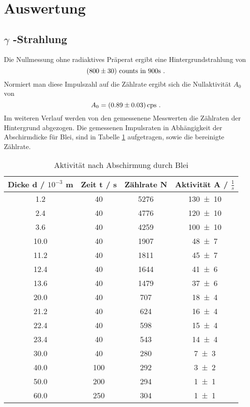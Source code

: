\section{Auswertung}
\label{sec:Auswertung}
\subsection{\texorpdfstring{$\gamma$ -Strahlung }%
                               {gamma -Strahlung}}
Die Nullmessung ohne radiaktives Präperat ergibt eine Hintergrundstrahlung von 
\begin{equation}
  (\num{800 +- 30}) \text{ counts in } 900 \text{s} \ .
  \label{eqn:gammacoun}
\end{equation}
Normiert man diese Impulszahl auf die Zählrate ergibt sich die Nullaktivität $A_0$ von
\begin{equation}
  A_0 = (\num{0.89 +- 0.03}) \, \text{cps} \ .
  \label{eqn:A0}
\end{equation}
Im weiteren Verlauf werden von den gemessenene Messwerten die Zählraten der Hintergrund abgezogen. Die gemessenen Impulsraten in Abhängigkeit der Abschirmdicke für Blei, sind in Tabelle \ref{tab:ABlei} aufgetragen, sowie die bereinigte Zählrate.
\begin{table}
  \centering
  \begin{tabular}{c c c c}
    \toprule
    Dicke d / $10^{-3}$ m & Zeit t / s & Zählrate N & Aktivität A / $\frac{1}{s}$ \\
    \midrule
    	1.2	&40 	&5276	&\num{130 +- 10} 	\\
	2.4	&40 	&4776	&\num{120 +- 10}	\\
	3.6	&40 	&4259	&\num{100 +- 10}	\\
	10.0	&40 	&1907	&\num{48 +- 7}	\\
	11.2	&40 	&1811	&\num{45 +- 7}	\\
	12.4	&40 	&1644	&\num{41 +- 6}	\\
	13.6	&40 	&1479	&\num{37 +- 6}	\\
	20.0	&40 	&707	&\num{18 +- 4}	\\
	21.2	&40 	&624	&\num{16 +- 4}	\\
	22.4	&40 	&598	&\num{15 +- 4}	\\
	23.4	&40 	&543	&\num{14 +- 4}	\\
	30.0	&40 	&280	&\num{7 +- 3}	\\
	40.0	&100	&292	&\num{3 +- 2}	\\
	50.0	&200	&294	&\num{1 +- 1}	\\
	60.0	&250	&304	&\num{1 +- 1}	\\
    \bottomrule
  \end{tabular}
  \caption{Aktivität nach Abschirmung durch Blei}
  \label{tab:ABlei}
\end{table}
